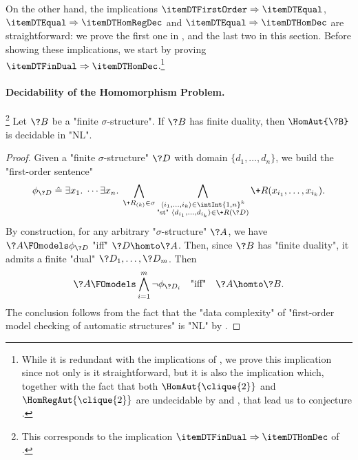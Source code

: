 On the other hand, the implications $\itemDTFirstOrder \Rightarrow \itemDTEqual$,
$\itemDTEqual \Rightarrow \itemDTHomRegDec$ and $\itemDTEqual \Rightarrow \itemDTHomDec$ are straightforward: we prove the first one in ,
and the last two in this section. 
Before showing these implications, we start by proving $\itemDTFinDual \Rightarrow \itemDTHomDec$.\footnote{While it is redundant with the implications of , 
we prove this implication since not only is it straightforward, but it is also
the implication which, together with the fact that both $\HomAut{\clique{2}}$
and $\HomRegAut{\clique{2}}$ are undecidable by
\cite[Proposition 6.5]{Kocher2014AutomatischenGraphen}
and , that lead us to conjecture
.}

\paragraph*{Decidability of the Homomorphism Problem.}

\begin{proposition}
	\!\footnote{This corresponds to the implication $\itemDTFinDual \Rightarrow \itemDTHomDec$
	of .}
	\AP\label{prop:dichotomy-FinDual-implies-HomDec}
	Let $\?B$ be a "finite $\sigma$-structure".
	If $\?B$ has finite duality, then $\HomAut{\?B}$ is decidable in "NL".
\end{proposition}

\begin{proof}
	Given a "finite $\sigma$-structure" $\?D$ with domain $\{d_1,\dotsc,d_n\}$,
	we build the "first-order sentence"
	\[
		\phi_{\?D} \defeq \exists x_1.\; \cdots \exists x_n.\;
		\bigwedge_{\+R_{(k)} \in \sigma} \bigwedge_{\substack{\tup{i_1,\dotsc,i_k} \in \intInt{1,n}^k\\\text{"st" }\tup{d_{i_1},\dotsc,d_{i_k}} \in \+R(\?D)}}
		\+R(x_{i_1},\dotsc,x_{i_k}).
	\]
	By construction, for any arbitrary "$\sigma$-structure" $\?A$, we have $\?A \FOmodels \phi_{\?D}$
	"iff" $\?D \homto \?A$.
	Then, since $\?B$ has "finite duality", it admits a finite "dual"
	$\?D_1,\dotsc,\?D_m$.
	Then
	\[
		\?A \FOmodels \bigwedge_{i=1}^m \neg \phi_{\?D_i}
		\quad\text{"iff"}\quad 
		\?A \homto \?B.
	\]
	The conclusion follows from the fact that the "data complexity"
	of "first-order model checking of automatic structures" is "NL"
	by .
\end{proof}

